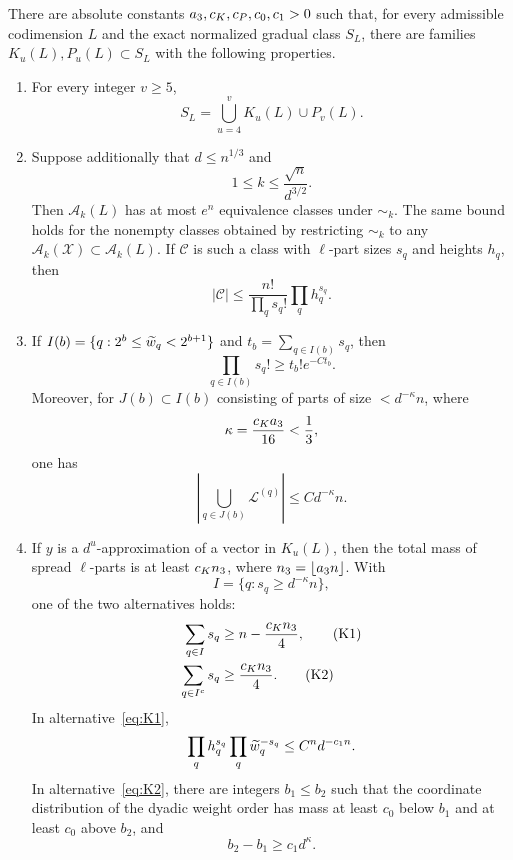 \begin{proposition}\label{prop:LLTTY-package}
There are absolute constants $a_3,c_K,c_P,c_0,c_1>0$ such that, for every admissible codimension $L$ and the exact normalized gradual class $S_L$, there are families $K_u(L),P_u(L)\subset S_L$ with the following properties.
\begin{enumerate}[label=\textup{(\roman*)}]
\item For every integer $v\ge5$,
\[
  S_L=\bigcup_{u=4}^{v}K_u(L)\cup P_v(L).
\]

\item Suppose additionally that $d\le n^{1/3}$ and
\[
  1\le k\le\frac{\sqrt n}{d^{3/2}}.
\]
Then $\mathcal A_k(L)$ has at most $e^n$ equivalence classes under $\sim_k$. The same bound holds for the nonempty classes obtained by restricting $\sim_k$ to any $\mathcal A_k(\mathcal X)\subset\mathcal A_k(L)$. If $\mathcal C$ is such a class with $\ell$-part sizes $s_q$ and heights $h_q$, then
\begin{equation}\label{eq:class-cardinality}
  |\mathcal C|\le\frac{n!}{\prod_qs_q!}\prod_q h_q^{s_q}.
\end{equation}

\item If $I(b)=\{q:2^b\le\widetilde w_q<2^{b+1}\}$ and $t_b=\sum_{q\in I(b)}s_q$, then
\begin{equation}\label{eq:factorial-compression}
  \prod_{q\in I(b)}s_q!\ge t_b!e^{-Ct_b}.
\end{equation}
Moreover, for $J(b)\subset I(b)$ consisting of parts of size $<d^{-\kappa}n$, where
\[
  \kappa=\frac{c_K a_3}{16}<\frac13,
\]
one has
\begin{equation}\label{eq:small-bin-mass}
  \left|\bigcup_{q\in J(b)}\mathcal L^{(q)}\right|\le Cd^{-\kappa}n.
\end{equation}

\item If $y$ is a $d^u$-approximation of a vector in $K_u(L)$, then the total mass of spread $\ell$-parts is at least $c_K n_3$, where $n_3=\left\lfloor a_3n\right\rfloor$. With
\[
  I=\{q:s_q\ge d^{-\kappa}n\},
\]
one of the two alternatives holds:
\begin{align}
  \sum_{q\in I}s_q&\ge n-\frac{c_K n_3}{4},\tag{K1}\label{eq:K1}\\
  \sum_{q\in I^c}s_q&\ge\frac{c_K n_3}{4}.\tag{K2}\label{eq:K2}
\end{align}
In alternative~\eqref{eq:K1},
\begin{equation}\label{eq:K1-product}
  \prod_qh_q^{s_q}\prod_q\widetilde w_q^{-s_q}\le C^n d^{-c_1n}.
\end{equation}
In alternative~\eqref{eq:K2}, there are integers $b_1\le b_2$ such that the coordinate distribution of the dyadic weight order has mass at least $c_0$ below $b_1$ and at least $c_0$ above $b_2$, and
\begin{equation}\label{eq:K2-separation}
  b_2-b_1\ge c_1d^\kappa.
\end{equation}


\end{enumerate}
\end{proposition}

